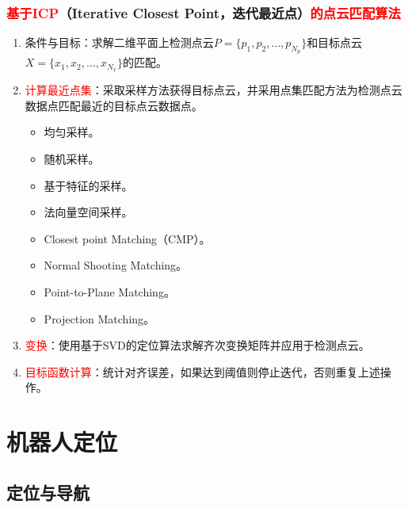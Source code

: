 \documentclass[
12pt, %
a4paper, 
oneside, %
]{scrartcl}
\begin{document}
\subsubsection[基于ICP的点云匹配算法]{\textcolor{red}{基于ICP}（Iterative Closest Point，迭代最近点）\textcolor{red}{的点云匹配算法}}
\begin{enumerate}
\item 条件与目标：求解二维平面上检测点云$ P = \{p_1, p_2, \dots, p_{N_p}\} $和目标点云$ X = \{x_1, x_2, \dots, x_{N_x}\} $的匹配。
\item \textcolor{red}{计算最近点集}：采取采样方法获得目标点云，并采用点集匹配方法为检测点云数据点匹配最近的目标点云数据点。

\begin{minipage}{0.5\textwidth}
\begin{itemize}
\item 均匀采样。
\item 随机采样。
\item 基于特征的采样。
\item 法向量空间采样。
\end{itemize}
\end{minipage}
\begin{minipage}{0.5\textwidth}
\begin{itemize}
\item Closest point Matching（CMP）。
\item Normal Shooting Matching。
\item Point-to-Plane Matching。
\item Projection Matching。
\end{itemize}
\end{minipage}
\item \textcolor{red}{变换}：使用基于SVD的定位算法求解齐次变换矩阵并应用于检测点云。
\item \textcolor{red}{目标函数计算}：统计对齐误差，如果达到阈值则停止迭代，否则重复上述操作。
\end{enumerate}
\section{机器人定位}
\subsection[定位与导航]{定位与导航}
\end{document}
